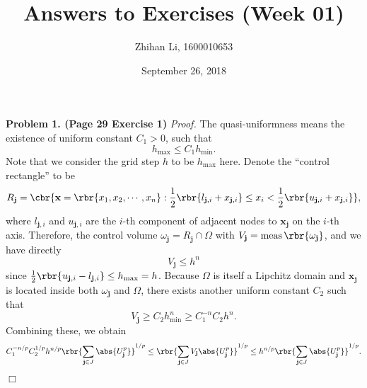 \documentclass[english, nochinese]{pnote}
\title{Answers to Exercises (Week 01)}
\author{Zhihan Li, 1600010653}
\date{September 26, 2018}
\begin{document}
\maketitle

\textbf{Problem 1. (Page 29 Exercise 1)} \textit{Proof.} The quasi-uniformness means the existence of uniform constant $ C_1 > 0 $, such that
\begin{equation}
h_{\text{max}} \le C_1 h_{\text{min}}.
\end{equation}
Note that we consider the grid step $h$ to be $ h_{\text{max}} $ here. Denote the ``control rectangle'' to be
\begin{equation}
R_{\mathbf{j}} = \cbr{ \mathbf{x} = \rbr{ x_1, x_2, \cdots, x_n } : \frac{1}{2} \rbr{ l_{ \mathbf{j}, i } + x_{ \mathbf{j}, i } } \le x_i < \frac{1}{2} \rbr{ u_{\mathbf{j}, i } + x_{ \mathbf{j}, i } } },
\end{equation}
where $ l_{ \mathbf{j}, i } $ and $ u_{ \mathbf{j}, i } $ are the $i$-th component of adjacent nodes to $\mathbf{x}_{\mathbf{j}}$ on the $i$-th axis.
Therefore, the control volume $ \omega_{\mathbf{j}} = R_{\mathbf{j}} \cap \Omega $ with $ V_{\mathbf{j}} = \mathop{\text{meas}} \rbr{\omega_{\mathbf{j}}} $,
and we have directly
\begin{equation}
V_{\mathbf{j}} \le h^n
\end{equation}
since $ \frac{1}{2} \rbr{ u_{ \mathbf{j}, i } - l_{ \mathbf{j}, i } } \le h_{\text{max}} = h $.
Because $\Omega$ is itself a Lipchitz domain and $\mathbf{x}_{\mathbf{j}}$ is located inside both $\omega_{\mathbf{j}}$ and $\Omega$, there exists another uniform constant $C_2$ such that
\begin{equation}
V_{\mathbf{j}} \ge C_2 h_{\text{min}}^n \ge C_1^{-n} C_2 h^n.
\end{equation}
Combining these, we obtain
\begin{equation}
C_1^{ -n / p } C_2^{ 1 / p } h^{ n / p } \rbr{\sum_{ \mathbf{j} \in J }{\abs{U_{\mathbf{j}}^p}}}^{ 1 / p } \le \rbr{\sum_{ \mathbf{j} \in J }{ V_{\mathbf{j}} \abs{U_{\mathbf{j}}^p} }}^{ 1 / p } \le h^{ n / p } \rbr{\sum_{ \mathbf{j} \in J }{\abs{U_{\mathbf{j}}^p}}}^{ 1 / p }.
\end{equation}

\hfill$\Box$
\end{document}
